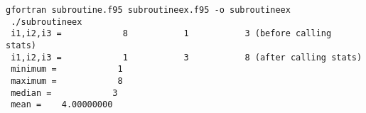 \begin{Verbatim}[frame=lines,label=subroutineex.f95 - commands and output]
 gfortran subroutine.f95 subroutineex.f95 -o subroutineex
 ./subroutineex
 i1,i2,i3 =            8           1           3 (before calling stats)
 i1,i2,i3 =            1           3           8 (after calling stats)
 minimum =            1
 maximum =            8
 median =            3
 mean =    4.00000000    
\end{Verbatim}

